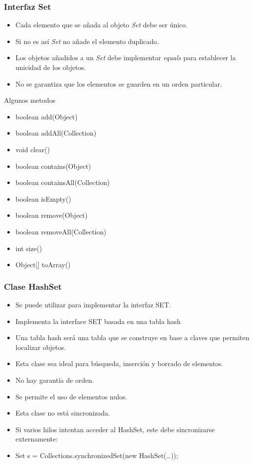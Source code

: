 \documentclass{beamer}
\begin{document}
\begin{frame}
\frametitle{Interfaz Set}
\begin{itemize}[<+->]
\item Cada elemento que se añada al objeto \emph{Set} debe ser único.
\item Si no es así \emph{Set} no añade el elemento duplicado.
\item Los objetos añadidos a un \emph{Set} debe implementar \emph{equals} para establecer la unicidad de los objetos.
\item No se garantiza que los elementos se guarden en un orden particular.
\end{itemize}
\pause
\begin{block}{Algunos metodos}
\begin{multicols}{2}
\begin{itemize}[<+->]
\item boolean add(Object)
\item boolean addAll(Collection)
\item void clear()
\item boolean contains(Object)
\item boolean containsAll(Collection)
\item boolean isEmpty()
\item boolean remove(Object)
\item boolean removeAll(Collection)
\item int size()
\item Object[] toArray()
\end{itemize}
\end{multicols}
\end{block}
\end{frame}

\begin{frame}
\frametitle{Clase HashSet}
\begin{itemize}[<+->]
\item Se puede utilizar para implementar la interfaz SET.
\item Implementa la interface SET basada en una tabla hash 
\item Una tabla hash será una tabla que se construye en base a claves que permiten localizar objetos.
\item Esta clase sea ideal para búsqueda, inserción y borrado de elementos.
\item No hay garantía de orden.
\item Se permite el uso de elementos nulos.
\item Esta clase no está sincronizada.
\item Si varios hilos intentan acceder al HashSet, este debe sincronizarse externamente:
\item Set s = Collections.synchronizedSet(new HashSet(\dots));
\end{itemize}
\end{frame}
\end{document}
